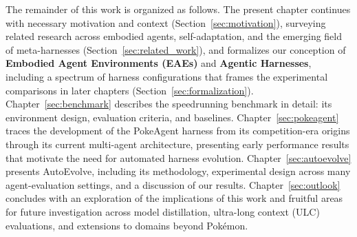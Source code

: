 The remainder of this work is organized as follows. The present chapter continues with necessary motivation and context (Section~\ref{sec:motivation}), surveying related research across embodied agents, self-adaptation, and the emerging field of meta-harnesses (Section~\ref{sec:related_work}), and formalizes our conception of \textbf{Embodied Agent Environments (EAEs)} and \textbf{Agentic Harnesses}, including a spectrum of harness configurations that frames the experimental comparisons in later chapters (Section~\ref{sec:formalization}). Chapter~\ref{sec:benchmark} describes the speedrunning benchmark in detail: its environment design, evaluation criteria, and baselines. Chapter~\ref{sec:pokeagent} traces the development of the PokeAgent harness from its competition-era origins through its current multi-agent architecture, presenting early performance results that motivate the need for automated harness evolution. Chapter~\ref{sec:autoevolve} presents AutoEvolve, including its methodology, experimental design across many agent-evaluation settings, and a discussion of our results. Chapter~\ref{sec:outlook} concludes with an exploration of the implications of this work and fruitful areas for future investigation across model distillation, ultra-long context (ULC) evaluations, and extensions to domains beyond Pok\'{e}mon.
